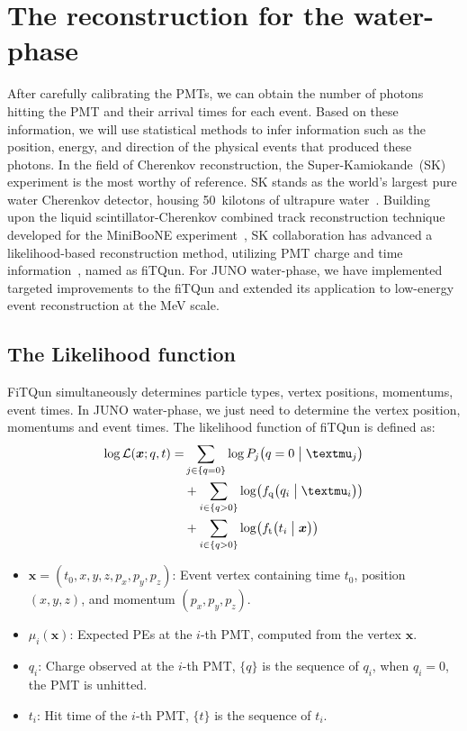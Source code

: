 
\chapter{The reconstruction for the water-phase}
\label{chap:recon}
After carefully calibrating the PMTs, we can obtain the number of photons hitting the PMT and their arrival times for each event. Based on these information, we will use statistical methods to infer information such as the position, energy, and direction of the physical events that produced these photons.
In the field of Cherenkov reconstruction, the Super-Kamiokande~(SK) experiment is the most worthy of reference. SK stands as the world's largest pure water Cherenkov detector, housing \SI{50}{kilotons} of ultrapure water~\cite{SK}. Building upon the liquid scintillator-Cherenkov combined track reconstruction technique developed for the MiniBooNE experiment~\cite{minibone}, SK collaboration has advanced a likelihood-based reconstruction method, utilizing PMT charge and time information~\cite{SKfiTQun}, named as fiTQun. For JUNO water-phase, we have implemented targeted improvements to the fiTQun and extended its application to low-energy event reconstruction at the \si{MeV} scale.

\section{The Likelihood function}
\label{sec:recon}
FiTQun simultaneously determines particle types, vertex positions, momentums, event times.
In JUNO water-phase, we just need to determine the vertex position, momentums and event times.
The likelihood function of fiTQun is defined as:
\begin{equation}
	\begin{aligned}
		\log \mathcal{L}(\boldsymbol{x};{q},{t}) = & \sum_{j \in \{q=0\}} \log P_j \bigl( q=0\bigm| \mu_j \bigr)                                      \\
		                                           & + \sum_{i \in \{q>0\}} \log \bigl( f_{\mathrm{q}}\bigl( q_i \bigm| \mu_i \bigr) \bigr)           \\
		                                           & + \sum_{i \in \{q>0\}} \log \bigl( f_{\mathrm{t}} \bigl( t_i \bigm| \boldsymbol{x} \bigr) \bigr)
	\end{aligned}
\end{equation}
\begin{itemize}
	\item $\boldsymbol{x} = (t_0, x, y, z, p_x, p_y, p_z)$: Event vertex containing time $t_0$, position $(x,y,z)$, and momentum $(p_x,p_y,p_z)$.
	\item $\mu_i(\boldsymbol{x})$: Expected PEs at the $i$-th PMT, computed from the vertex $\boldsymbol{x}$.
	\item $q_i$: Charge observed at the $i$-th PMT, $\{q\}$ is the sequence of $q_i$, when $q_i=0$, the PMT is unhitted.
	\item $t_i$: Hit time of the $i$-th PMT, $\{t\}$ is the sequence of $t_i$.
\end{itemize}

